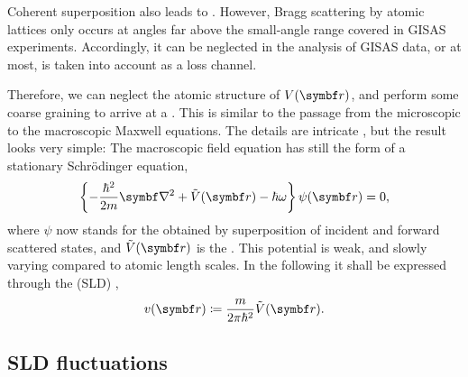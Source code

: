 Coherent superposition also leads to .
%
However, Bragg scattering by atomic lattices only occurs at angles
far above the small-angle range covered in GISAS experiments.
Accordingly, it can be neglected in the analysis of GISAS data,
or at most, is taken into account as a loss channel.

Therefore,
we can neglect the atomic structure of $V(\r)$,
and perform some coarse graining to
arrive at a .
%
This is
similar to the passage from
the microscopic to the macroscopic Maxwell equations.
The details are intricate \cite{Sea89,Lax51},
but the result \cite[eq.~2.8.32]{Sea89} looks very simple:
The macroscopic field equation
has still the form of a stationary Schrödinger equation,
%
\begin{equation}\label{EmacrSchrodi}
  \left\{-\frac{\hbar^2}{2m}\Nabla^2+\Vmac(\r)-\hbar\omega\right\} \psi(\r) = 0,
\end{equation}
%
%
where $\psi$ now stands for the 
%
%
obtained by superposition of
incident and forward scattered states,
and $\Vmac(\r)$ is the .
%
This potential is weak, and slowly varying compared to atomic length scales.
In the following it shall be expressed through the
 (SLD)
%
%
%
\cite[eq.\ 2.8.37]{Sea89},
%
\begin{equation}
  v(\r)\coloneqq\frac{m}{2\pi \hbar^2}\Vmac(\r).
\end{equation}

\subsection{SLD fluctuations}

